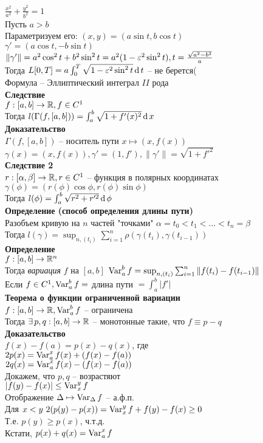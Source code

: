 \documentclass[12pt]{article}
\begin{document}
$\frac{x^2}{a^2} + \frac{y^2}{b^2}=1$\\
Пусть $a > b$\\
Параметризуем его: $(x, y) = (a\sin t, b\cos t)$\\
$\gamma' = (a\cos t, -b\sin t)$\\
$\|\gamma'\| = a^2\cos^2 t + b^2 \sin^2 t = a^2(1 -\varepsilon^2 \sin^2 t), t = \frac{\sqrt{a^2 - b^2}}{a}$\\
Тогда $L[0,T] = a\int_0^T\sqrt{1-\varepsilon^2 \sin^2 t}\operatorname{d} t$ -- не берется(\\
Формула -- Эллиптический интеграл $II$ рода\\
\textbf{Следствие}\\
$f:[a,b] \rightarrow \mathbb{R}, f\in C^1$\\
Тогда $l(\Gamma(f, [a,b])) = \int_a^b \sqrt{1 + f'(x)^2}\operatorname{d} x$\\
\textbf{Доказательство}\\
$\Gamma(f, [a,b])$ -- носитель пути $x \mapsto (x, f(x))$\\
$\gamma(x) = (x, f(x)), \gamma'=(1,f'), \|\gamma'\| = \sqrt{1 + f'^2}$\\
\textbf{Следствие 2}\\
$r: [\alpha, \beta] \rightarrow \mathbb{R}, r \in C^1$ -- функция в полярных координатах\\
$\gamma(\phi) = (r(\phi)\cos \phi, r(\phi)\sin\phi)$\\
Тогда $l(\phi) = \int_a^b \sqrt{r^2 + r'^2}\operatorname{d} \phi$\\
\textbf{Определение (способ определения длины пути)}\\
Разобъем кривую на $n$ частей "точками" $\alpha = t_0 < t_1 < \ldots < t_n = \beta$\\
Тогда $l(\gamma) = \sup_{n, (t_i)} \sum_{i=1}^n \rho(\gamma(t_i), \gamma(t_{i-1}))$\\
\textbf{Определение}\\
$f:[a, b] \rightarrow \mathbb{R}^n$\\
Тогда \textit{вариация} $f$ на $[a,b]$ $\operatorname{Var}_a^b f = \sup_{n, (t_i)} \sum_{i=1}^n \|f(t_i)-f(t_{i-1})\|$\\
Если $f \in C^1, \operatorname{Var}_a^b f = $ длина пути $ = \int_a^b |f'|$\\
\textbf{Теорема о функции ограниченной вариации}\\
$f:[a,b] \rightarrow \mathbb{R}, \operatorname{Var}_a^b f$ -- ограничена\\
Тогда $\exists\, p,q: [a,b]\rightarrow \mathbb{R}$ -- монотонные такие, что $f\equiv p-q$\\
\textbf{Доказательство}\\
$f(x)-f(a)=p(x)-q(x)$, где\\
$2p(x) = \operatorname{Var}_a^x f(x)+(f(x)-f(a))$\\
$2q(x) = \operatorname{Var}_a^x f(x) - (f(x) - f(a))$\\
Докажем, что $p,q$ -- возрастяют\\
$|f(y)-f(x)| \leq \operatorname{Var}_x^y f$\\
Отображение $\Delta \mapsto \operatorname{Var}_\Delta f$ -- а.ф.п.\\
Для $x < y\ 2(p(y)-p(x))=\operatorname{Var}_x^y f + f(y)-f(x) \geq 0$\\
Т.е. $p(y) \geq p(x)$, ч.т.д.\\
Кстати, $p(x) + q(x) = \operatorname{Var}_a^x f$\\
\end{document}
